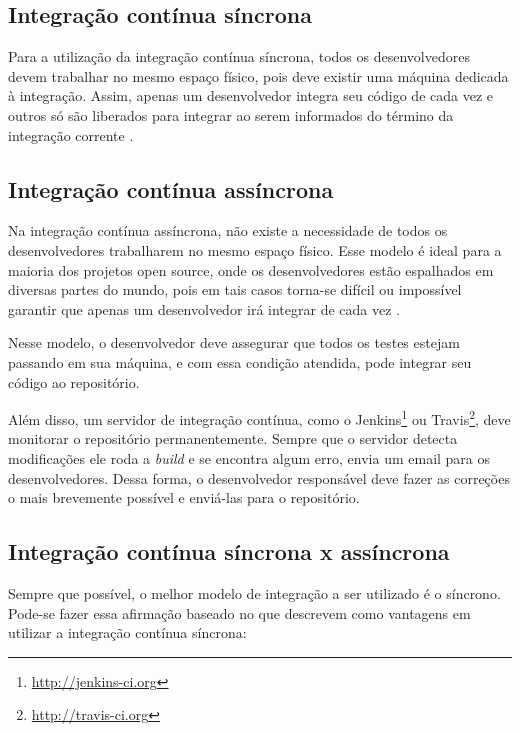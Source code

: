 \subsection{Integração contínua síncrona} %
\label{sub:integracao_continua_sincrona}

Para a utilização da integração contínua síncrona, todos os desenvolvedores devem trabalhar no mesmo espaço físico, pois deve existir uma máquina dedicada à integração. Assim, apenas um desenvolvedor integra seu código de cada vez e outros só são liberados para integrar ao serem informados do término da integração corrente \cite{ImproveitCI}.



\subsection{Integração contínua assíncrona} %
\label{sub:integracao_continua_assincrona}

Na integração contínua assíncrona, não existe a necessidade de todos os desenvolvedores trabalharem no mesmo espaço físico. Esse modelo é ideal para a maioria dos projetos open source, onde os desenvolvedores estão espalhados em diversas partes do mundo, pois em tais casos torna-se difícil ou impossível garantir que apenas um desenvolvedor irá integrar de cada vez \cite{ImproveitCI}.

Nesse modelo, o desenvolvedor deve assegurar que todos os testes estejam passando em sua máquina, e com essa condição atendida, pode integrar seu código ao repositório.

Além disso, um servidor de integração contínua, como o Jenkins\footnote{\url{http://jenkins-ci.org}} ou Travis\footnote{\url{http://travis-ci.org}}, deve monitorar o repositório permanentemente. Sempre que o servidor detecta modificações ele roda a \textit{build} e se encontra algum erro, envia um email para os desenvolvedores. Dessa forma, o desenvolvedor responsável deve fazer as correções o mais brevemente possível e enviá-las para o repositório.


\subsection{Integração contínua síncrona x assíncrona} %
\label{sub:sincrona_x_assincrona}

Sempre que possível, o melhor modelo de integração a ser utilizado é o síncrono. Pode-se fazer essa afirmação baseado no que  descrevem como vantagens em utilizar a integração contínua síncrona:

